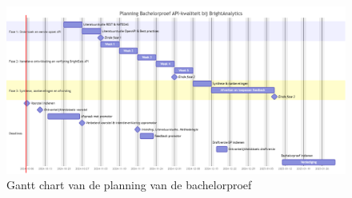 \clearpage

\begin{figure}[H]
  \centering
  \includegraphics[width=\textwidth, keepaspectratio]{gantt-chart/gantt-chart.png}
  \caption{Gantt chart van de planning van de bachelorproef}
  \label{fig:gantt-chart}
\end{figure}
